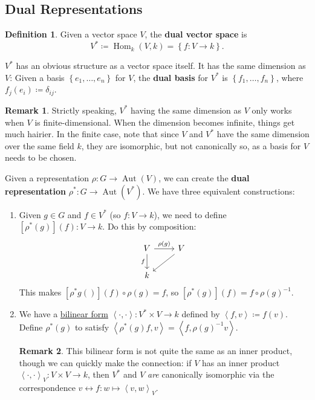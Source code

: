 \documentclass[12pt]{article}
\newcommand{\ita}[1]{\textit{#1}}
\newcommand\inv[1]{#1^{-1}}
\newcommand\setb[1]{\left \{ #1 \right \}}
\newcommand{\vbrack}[1]{\left \langle #1 \right \rangle}
\theoremstyle{definition}
\newtheorem{definition}[theorem]{Definition}
\newtheorem*{remark}{Remark}
\DeclareMathOperator\Aut{Aut}
\DeclareMathOperator\Hom{Hom}
\begin{document}
\subsection{Dual Representations}
\begin{definition}
    Given a vector space $V$, the \textbf{dual vector space} is 
    \begin{equation}
        V^* \coloneqq  \Hom_k (V , k) = \setb{f : V \to k}.
    \end{equation}
\end{definition}
$V^*$ has an obvious structure as a vector space itself. It has the same dimension as $V$: Given a basis $\setb{e_1 , \dotsc, e_n}$ for $V$, the \textbf{dual basis} for $V^*$ is $\setb{f_1 , \dotsc, f_n}$, where $f_j(e_i) \coloneqq  \delta_{ij}$. 
\begin{remark}
    Strictly speaking, $V^*$ having the same dimension as $V$ only works when $V$ is finite-dimensional. When the dimension becomes infinite, things get much hairier. In the finite case, note that since $V$ and $V^*$ have the same dimension over the same field $k$, they are isomorphic, but not canonically so, as a basis for $V$ needs to be chosen.
\end{remark}
Given a representation $\rho : G \to \Aut(V)$, we can create the \textbf{dual representation} $\rho^* : G \to \Aut(V^*)$. We have three equivalent constructions:
\begin{enumerate}
    \item Given $g \in G$ and $f \in V^*$ (so $f : V \to k$), we need to define $\left[ \rho^*(g) \right](f) : V \to k$. Do this by composition:
    \begin{equation}
        \begin{tikzcd}
            V \arrow[r,"\rho(g)"] \arrow[d,"f"'] & V \arrow[dl] \\
            k
        \end{tikzcd}
    \end{equation}
    This makes $\left[ \rho^*g() \right](f) \circ \rho(g) = f$, so $\boxed{\left[ \rho^*(g) \right](f) = f \circ \inv{\rho(g)}.}$
    \item We have a \underline{bilinear form} $\vbrack{\cdot , \cdot} : V^* \times V \to k$ defined by $\vbrack{f , v} \coloneqq  f(v)$. Define $\rho^*(g)$ to satisfy $\vbrack{\rho^*(g)f , v} = \vbrack{f , \inv{\rho(g)} v}$.
    \begin{remark}
        This bilinear form is not quite the same as an inner product, though we can quickly make the connection: if $V$ has an inner product $\vbrack{\cdot , \cdot}_V : V \times V \to k$, then $V^*$ and $V$ \ita{are} canonically isomorphic via the correspondence $v \leftrightarrow f : w \mapsto \vbrack{v,w}_V$. 
    \end{remark}
\end{enumerate}
\end{document}
